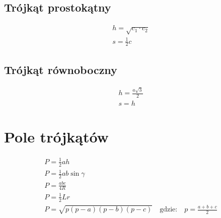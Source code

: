 \documentclass{article}
\numberwithin{equation}{section}
\begin{document}
    \subsection{Trójkąt prostokątny}
      \begin{center}
      \end{center}
      \begin{gather}
        h = \sqrt{c_1\cdot c_2}\\
        s = \frac 12c
      \end{gather}
    \subsection{Trójkąt równoboczny}
      \begin{center}
      \end{center}
      \begin{gather}
        h = \frac{a\sqrt3}{2}\\
        s = h
      \end{gather}

  \section{Pole trójkątów}
    \begin{gather}
      P = \frac 12ah\\
      P = \frac 12ab\sin\gamma\\
      P = \frac{abc}{4R}\\
      P = \frac 12Lr\\
      P = \sqrt{p(p-a)(p-b)(p-c)}\quad\text{gdzie:}\quad p = \frac{a+b+c}{2}
    \end{gather}
\end{document}
